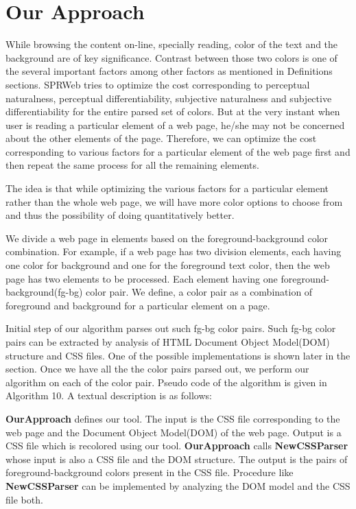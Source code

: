 \section{Our Approach}
\label{Our Approach}
While browsing the content on-line, specially reading, color of the text and the background are of key significance. Contrast between those two colors is one of the several important factors among other factors as mentioned in Definitions sections. SPRWeb tries to optimize the cost corresponding to perceptual naturalness, perceptual differentiability, subjective naturalness and subjective differentiability for the entire parsed set of colors. But at the very instant when user is reading a particular element of a web page, he/she may not be concerned about the other elements of the page. Therefore, we can optimize the cost corresponding to various factors for a particular element of the web page first and then repeat the same process for all the remaining elements. 


The idea is that while optimizing the various factors for a particular element rather than the whole web page, we will have more color options to choose from and thus the possibility of doing quantitatively better.


We divide a web page in elements based on the foreground-background color combination. For example, if a web page has two division elements, each having one color for background and one for the foreground text color, then the web page has two elements to be processed. Each element having one foreground-background(fg-bg) color pair. We define, a color pair as a combination of foreground and background for a particular element on a page.

Initial step of our algorithm parses out such fg-bg color pairs. Such fg-bg color pairs can be extracted by analysis of HTML Document Object Model(DOM) structure and CSS files. One of the possible implementations is shown later in the section. Once we have all the the color pairs parsed out, we perform our algorithm on each of the color pair. Pseudo code of the algorithm is given in Algorithm 10. A textual description is as follows:

\textbf{OurApproach} defines our tool. The input is the CSS file corresponding to the web page and the Document Object Model(DOM) of the web page. Output is a CSS file which is recolored using our tool. \textbf{OurApproach} calls \textbf{NewCSSParser} whose input is also a CSS file and the DOM structure. The output is the pairs of foreground-background colors present in the CSS file. Procedure like \textbf{NewCSSParser} can be implemented by analyzing the DOM model and the CSS file both. 


